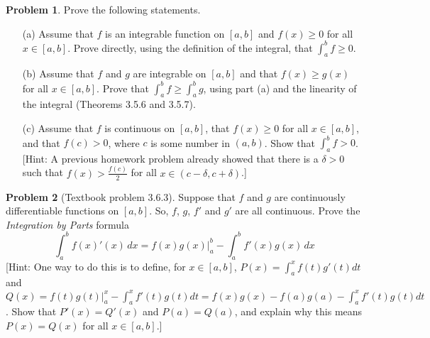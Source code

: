 \documentclass[12pt]{article}
\theoremstyle{definition}
\newtheorem{problem}{Problem}
\newenvironment{answer}{\par\medskip\bgroup\color{darkblue}}{\egroup\medskip}
\begin{document}
\begin{problem} %
Prove the following statements.
\begin{itemize}
\item[(a)] Assume that $f$ is an integrable function on $[a,b]$ and $f(x)\ge 0$ for all $x\in[a,b]$.
Prove directly, using the definition of the integral, that $\int_a^b f\ge 0$.
\item[(b)] Assume that $f$ and $g$ are integrable on $[a,b]$ and that $f(x)\ge g(x)$ for all $x\in [a,b]$.
Prove that $\int_a^b f \ge \int_a^b g$, using part (a) and the linearity of the integral (Theorems 3.5.6 and 3.5.7).
\item[(c)] Assume that $f$ is continuous on $[a,b]$, that $f(x)\ge 0$ for all $x\in[a,b]$, and that $f(c)>0$,
where $c$ is some number in $(a,b)$.  Show that $\int_a^b f>0$.  [Hint:  A previous homework problem already 
showed that there is a $\delta>0$ such that $f(x)>\frac{f(c)}{2}$ for all $x\in(c-\delta,c+\delta)$.]
\end{itemize}
\end{problem}

\begin{answer}
\end{answer}




\begin{problem}  %
[Textbook problem 3.6.3]
Suppose that $f$ and $g$ are continuously differentiable functions on $[a,b]$.  So,
$f$, $g$, $f'$ and $g'$ are all continuous.  Prove the \textit{Integration by Parts}
formula $$\int_a^b f(x)'(x)\,dx = f(x)g(x)\bigg|_a^b - \int_a^bf'(x)g(x)\,dx$$
[Hint: One way to do this is to define, for $x\in[a,b]$,  $P(x) = \int_a^xf(t)g'(t)dt$
and $Q(x) = f(t)g(t)\big|_a^x - \int_a^x f'(t)g(t)dt = f(x)g(x)- f(a)g(a) - \int_a^xf'(t)g(t)dt$. 
Show that $P'(x) = Q'(x)$ and $P(a)=Q(a)$, and explain why this means $P(x) = Q(x)$
for all $x\in[a,b]$.] 
\end{problem}

\begin{answer}
\end{answer}
\end{document}

